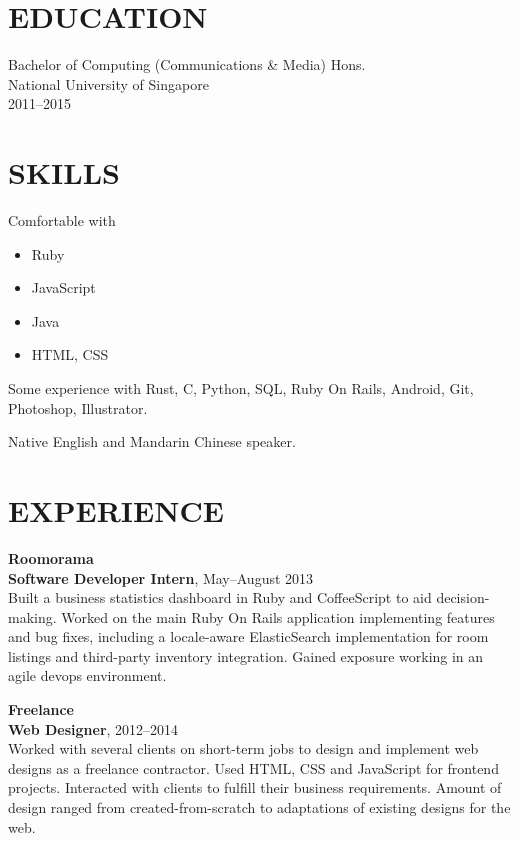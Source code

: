 \documentclass[line, margin]{res}
\makeatletter
\newcommand{\at}[0]{@}
\makeatother
\begin{document}
\address{
    \href{mailto:ng.guoyou+cv\at gmail.com}{ng.guoyou\at gmail.com}
    \href{http://github.com/gyng}{http://github.com/gyng}
}

\begin{resume}
    \section{EDUCATION}
        Bachelor of Computing (Communications \& Media) Hons. \\
        National University of Singapore \\
        2011--2015

    \section{SKILLS}
        Comfortable with \\
        \begin{itemize}[leftmargin=*]
        \item Ruby
        \item JavaScript
        \item Java
        \item \textsc{HTML, CSS}
        \end{itemize}

        Some experience with Rust, C, Python, SQL, Ruby On Rails, Android, Git, Photoshop, Illustrator.

        Native English and Mandarin Chinese speaker.

    \section{EXPERIENCE}
        \textbf{Roomorama} \\
        \textbf{Software Developer Intern}, May--August 2013 \\
        Built a business statistics dashboard in Ruby and CoffeeScript to aid decision-making. Worked on the main Ruby On Rails application implementing features and bug fixes, including a locale-aware ElasticSearch implementation for room listings and third-party inventory integration. Gained exposure working in an agile devops environment.

        \textbf{Freelance} \\
        \textbf{Web Designer}, 2012--2014 \\
        Worked with several clients on short-term jobs to design and implement web designs as a freelance contractor. Used HTML, CSS and JavaScript for frontend projects. Interacted with clients to fulfill their business requirements. Amount of design ranged from created-from-scratch to adaptations of existing designs for the web.


\end{resume}
\end{document}
